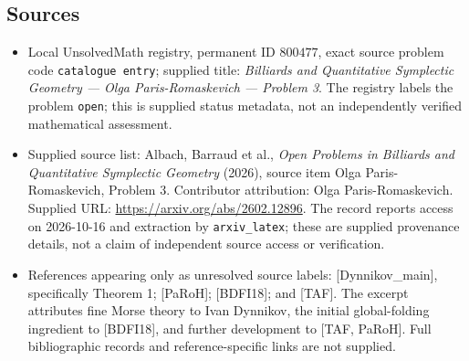 \documentclass[11pt]{article}
\begin{document}
\subsection{Sources}
\begin{itemize}
\item Local UnsolvedMath registry, permanent ID \(800477\), exact source problem code \texttt{catalogue entry}; supplied title: \emph{Billiards and Quantitative Symplectic Geometry --- Olga Paris-Romaskevich --- Problem 3}. The registry labels the problem \texttt{open}; this is supplied status metadata, not an independently verified mathematical assessment.
\item Supplied source list: Albach, Barraud et al., \emph{Open Problems in Billiards and Quantitative Symplectic Geometry} (2026), source item Olga Paris-Romaskevich, Problem 3. Contributor attribution: Olga Paris-Romaskevich. Supplied URL: \url{https://arxiv.org/abs/2602.12896}. The record reports access on 2026-10-16 and extraction by \texttt{arxiv\_latex}; these are supplied provenance details, not a claim of independent source access or verification.
\item References appearing only as unresolved source labels: [Dynnikov\_main], specifically Theorem 1; [PaRoH]; [BDFI18]; and [TAF]. The excerpt attributes fine Morse theory to Ivan Dynnikov, the initial global-folding ingredient to [BDFI18], and further development to [TAF, PaRoH]. Full bibliographic records and reference-specific links are not supplied.
\end{itemize}
\end{document}
